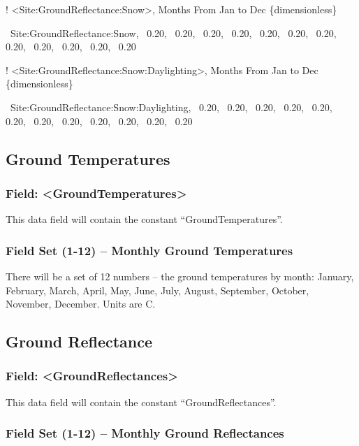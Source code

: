 ! \textless{}Site:GroundReflectance:Snow\textgreater{}, Months From Jan to Dec \{dimensionless\}

~Site:GroundReflectance:Snow,~ 0.20,~ 0.20,~ 0.20,~ 0.20,~ 0.20,~ 0.20,~ 0.20,~ 0.20,~ 0.20,~ 0.20,~ 0.20,~ 0.20

! \textless{}Site:GroundReflectance:Snow:Daylighting\textgreater{}, Months From Jan to Dec \{dimensionless\}

~Site:GroundReflectance:Snow:Daylighting,~ 0.20,~ 0.20,~ 0.20,~ 0.20,~ 0.20,~ 0.20,~ 0.20,~ 0.20,~ 0.20,~ 0.20,~ 0.20,~ 0.20

\subsection{Ground Temperatures}\label{ground-temperatures}

\subsubsection{Field: \textless{}GroundTemperatures\textgreater{}}\label{field-groundtemperatures}

This data field will contain the constant ``GroundTemperatures''.

\subsubsection{Field Set (1-12) -- Monthly Ground Temperatures}\label{field-set-1-12-monthly-ground-temperatures}

There will be a set of 12 numbers -- the ground temperatures by month: January, February, March, April, May, June, July, August, September, October, November, December. Units are C.

\subsection{Ground Reflectance}\label{ground-reflectance}

\subsubsection{Field: \textless{}GroundReflectances\textgreater{}}\label{field-groundreflectances}

This data field will contain the constant ``GroundReflectances''.

\subsubsection{Field Set (1-12) -- Monthly Ground Reflectances}\label{field-set-1-12-monthly-ground-reflectances}

